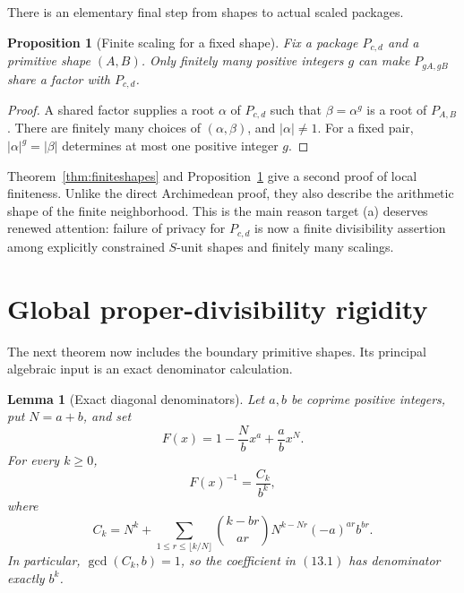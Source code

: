 \documentclass[11pt]{article}
\newtheorem{proposition}[theorem]{Proposition}
\newtheorem{lemma}[theorem]{Lemma}
\theoremstyle{definition}
\begin{document}
There is an elementary final step from shapes to actual scaled packages.

\begin{proposition}[Finite scaling for a fixed shape]
\label{prop:finitescaling}
Fix a package \(P_{c,d}\) and a primitive shape \((A,B)\).  Only finitely
many positive integers \(g\) can make \(P_{gA,gB}\) share a factor with
\(P_{c,d}\).
\end{proposition}

\begin{proof}
A shared factor supplies a root \(\alpha\) of \(P_{c,d}\) such that
\(\beta=\alpha^g\) is a root of \(P_{A,B}\).  There are finitely many
choices of \((\alpha,\beta)\), and \(|\alpha|\neq1\).  For a fixed pair,
\(|\alpha|^g=|\beta|\) determines at most one positive integer \(g\).
\end{proof}

Theorem~\ref{thm:finiteshapes} and Proposition~\ref{prop:finitescaling}
give a second proof of local finiteness.  Unlike the direct Archimedean proof,
they also describe the arithmetic shape of the finite neighborhood.  This is
the main reason target (a) deserves renewed attention: failure of privacy for
\(P_{c,d}\) is now a finite divisibility assertion among explicitly
constrained \(S\)-unit shapes and finitely many scalings.

\section{Global proper-divisibility rigidity}
\label{sec:nodivision}

The next theorem now includes the boundary primitive shapes.  Its principal
algebraic input is an exact denominator calculation.

\begin{lemma}[Exact diagonal denominators]\label{lem:diagonaldenominator}
Let \(a,b\) be coprime positive integers, put \(N=a+b\), and set
\[
 F(x)=1-\frac Nb x^a+\frac ab x^N.
\]
For every \(k\geq0\),
\begin{equation}
 [x^{ka}]F(x)^{-1}=\frac{C_k}{b^k},
 \tag{13.1}
\end{equation}
where
\begin{equation}
 C_k=N^k+
 \sum_{1\leq r\leq\lfloor k/N\rfloor}
 \binom{k-br}{ar}N^{k-Nr}(-a)^{ar}b^{br}.
 \tag{13.2}
\end{equation}
In particular, \(\gcd(C_k,b)=1\), so the coefficient in \((13.1)\) has
denominator exactly \(b^k\).
\end{lemma}
\end{document}
